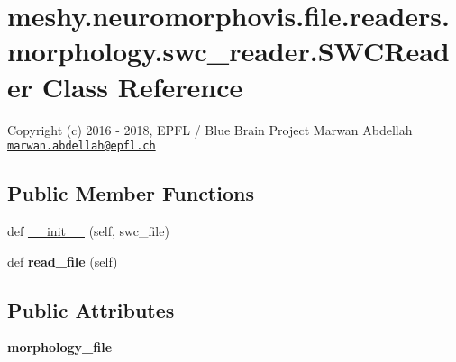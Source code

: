 \hypertarget{classmeshy_1_1neuromorphovis_1_1file_1_1readers_1_1morphology_1_1swc__reader_1_1SWCReader}{}\section{meshy.\+neuromorphovis.\+file.\+readers.\+morphology.\+swc\+\_\+reader.\+S\+W\+C\+Reader Class Reference}
\label{classmeshy_1_1neuromorphovis_1_1file_1_1readers_1_1morphology_1_1swc__reader_1_1SWCReader}


Copyright (c) 2016 -\/ 2018, E\+P\+FL / Blue Brain Project Marwan Abdellah \href{mailto:marwan.abdellah@epfl.ch}{\tt marwan.\+abdellah@epfl.\+ch}  


\subsection*{Public Member Functions}
\begin{DoxyCompactItemize}
\item 
def \hyperlink{classmeshy_1_1neuromorphovis_1_1file_1_1readers_1_1morphology_1_1swc__reader_1_1SWCReader_a40f01ec5d109650c9172dfc628cfc84b}{\+\_\+\+\_\+init\+\_\+\+\_\+} (self, swc\+\_\+file)
\item 
def {\bfseries read\+\_\+file} (self)\hypertarget{classmeshy_1_1neuromorphovis_1_1file_1_1readers_1_1morphology_1_1swc__reader_1_1SWCReader_a786453425fadc8dfdb7b57e2b5b85c73}{}\label{classmeshy_1_1neuromorphovis_1_1file_1_1readers_1_1morphology_1_1swc__reader_1_1SWCReader_a786453425fadc8dfdb7b57e2b5b85c73}

\end{DoxyCompactItemize}
\subsection*{Public Attributes}
\begin{DoxyCompactItemize}
\item 
{\bfseries morphology\+\_\+file}\hypertarget{classmeshy_1_1neuromorphovis_1_1file_1_1readers_1_1morphology_1_1swc__reader_1_1SWCReader_a24b197eed55f394383b6c2778dc0194d}{}\label{classmeshy_1_1neuromorphovis_1_1file_1_1readers_1_1morphology_1_1swc__reader_1_1SWCReader_a24b197eed55f394383b6c2778dc0194d}

\end{DoxyCompactItemize}


